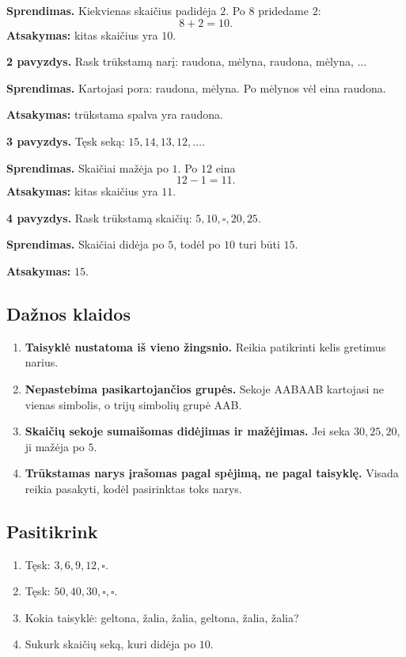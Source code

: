 \textbf{Sprendimas.} Kiekvienas skaičius padidėja \(2\). Po \(8\) pridedame \(2\):
\[
8+2=10.
\]
\textbf{Atsakymas:} kitas skaičius yra \(10\).

\textbf{2 pavyzdys.} Rask trūkstamą narį: raudona, mėlyna, raudona, mėlyna, \(\ldots\)

\textbf{Sprendimas.} Kartojasi pora: raudona, mėlyna. Po mėlynos vėl eina raudona.

\textbf{Atsakymas:} trūkstama spalva yra raudona.

\textbf{3 pavyzdys.} Tęsk seką: \(15,14,13,12,\ldots\).

\textbf{Sprendimas.} Skaičiai mažėja po \(1\). Po \(12\) eina
\[
12-1=11.
\]
\textbf{Atsakymas:} kitas skaičius yra \(11\).

\textbf{4 pavyzdys.} Rask trūkstamą skaičių: \(5,10,\square,20,25\).

\textbf{Sprendimas.} Skaičiai didėja po \(5\), todėl po \(10\) turi būti \(15\).

\textbf{Atsakymas:} \(15\).

\subsection{Dažnos klaidos}

\begin{enumerate}
\item \textbf{Taisyklė nustatoma iš vieno žingsnio.} Reikia patikrinti kelis gretimus narius.
\item \textbf{Nepastebima pasikartojančios grupės.} Sekoje AABAAB kartojasi ne vienas simbolis, o trijų simbolių grupė AAB.
\item \textbf{Skaičių sekoje sumaišomas didėjimas ir mažėjimas.} Jei seka \(30,25,20\), ji mažėja po \(5\).
\item \textbf{Trūkstamas narys įrašomas pagal spėjimą, ne pagal taisyklę.} Visada reikia pasakyti, kodėl pasirinktas toks narys.
\end{enumerate}

\subsection{Pasitikrink}

\begin{enumerate}
\item Tęsk: \(3,6,9,12,\square\).
\item Tęsk: \(50,40,30,\square,\square\).
\item Kokia taisyklė: geltona, žalia, žalia, geltona, žalia, žalia?
\item Sukurk skaičių seką, kuri didėja po \(10\).
\end{enumerate}

